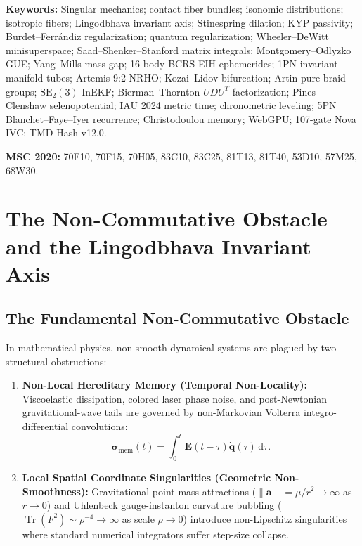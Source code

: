 \documentclass[11pt,a4paper,reqno]{article}
\theoremstyle{plain}
\theoremstyle{definition}
\theoremstyle{remark}
\numberwithin{equation}{section}
\numberwithin{table}{section}
\providecommand{\diff}{\mathrm{d}}
\begin{document}
\vspace{0.8ex}
\noindent\textbf{Keywords:} Singular mechanics; contact fiber bundles; isonomic distributions; isotropic fibers; Lingodbhava invariant axis; Stinespring dilation; KYP passivity; Burdet--Ferr\'andiz regularization; quantum regularization; Wheeler--DeWitt minisuperspace; Saad--Shenker--Stanford matrix integrals; Montgomery--Odlyzko GUE; Yang--Mills mass gap; 16-body BCRS EIH ephemerides; 1PN invariant manifold tubes; Artemis 9:2 NRHO; Kozai--Lidov bifurcation; Artin pure braid groups; $\mathrm{SE}_2(3)$ InEKF; Bierman--Thornton $UDU^T$ factorization; Pines--Clenshaw selenopotential; IAU 2024 metric time; chronometric leveling; 5PN Blanchet--Faye--Iyer recurrence; Christodoulou memory; WebGPU; 107-gate Nova IVC; TMD-Hash v12.0.

\vspace{0.4ex}
\noindent\textbf{MSC 2020:} 70F10, 70F15, 70H05, 83C10, 83C25, 81T13, 81T40, 53D10, 57M25, 68W30.

\clearpage
\tableofcontents
\clearpage

\section{The Non-Commutative Obstacle and the Lingodbhava Invariant Axis}
\label{sec:lingodbhava_foundation}

\subsection{The Fundamental Non-Commutative Obstacle}
In mathematical physics, non-smooth dynamical systems are plagued by two structural obstructions:
\begin{enumerate}[label=(\alph*)]
  \item \textbf{Non-Local Hereditary Memory (Temporal Non-Locality):} Viscoelastic dissipation, colored laser phase noise, and post-Newtonian gravitational-wave tails are governed by non-Markovian Volterra integro-differential convolutions:
  \begin{equation}
    \bm{\sigma}_{\mathrm{mem}}(t) = \int_0^t \mathbf{E}(t - \tau) \dot{\bm{q}}(\tau) \, \diff\tau.
    \label{eq:volterra_convolution_general}
  \end{equation}
  \item \textbf{Local Spatial Coordinate Singularities (Geometric Non-Smoothness):} Gravitational point-mass attractions ($\|\bm{a}\| = \mu/r^2 \to \infty$ as $r \to 0$) and Uhlenbeck gauge-instanton curvature bubbling ($\operatorname{Tr}(F^2) \sim \rho^{-4} \to \infty$ as scale $\rho \to 0$) \cite{Uhlenbeck1982} introduce non-Lipschitz singularities where standard numerical integrators suffer step-size collapse.
\end{enumerate}
\end{document}
